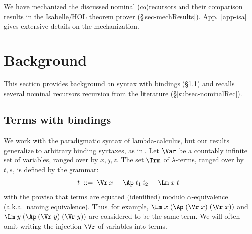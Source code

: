 We have mechanized 
the discussed nominal (co)recursors and their comparison results 
in the Isabelle/HOL theorem prover \cite{LNCS2283} (\S\ref{sec-mechResults}).  
App.~\ref{app-isa} gives extensive details on the mechanization. 


\section{Background} %
\label{sec-nomRec}

This section provides %
background on syntax with bindings (\S\ref{subsec-terms}) and 
recalls %
several 
nominal recursors 
recursion from the literature 
(\S\ref{subsec-nominalRec}).    

\vspace*{-0.5ex}\subsection{Terms with bindings}
\label{subsec-terms}

We work with the paradigmatic syntax of %
lambda-calculus, but our results %
generalize to arbitrary binding syntaxes, as in %
 \cite{pitts-AlphaStructural, nominalTwo}.  %
%
Let $\Var$ be a countably infinite set of variables, ranged over 
by $x,y,z$. %
%
The set $\Trm$ of $\lambda$-terms, ranged over by $t,s$, %
is defined by the grammar: 
%	
  \vspace*{-1.3ex}
	$$
	t \;::=\; \Vr\;x  \;\mid\; \Ap\;t_1\;t_2  \;\mid\; \Lm\;x\;t
		\vspace*{-1ex}
	$$
with the proviso that terms are equated (identified) modulo $\alpha$-equivalence (a.k.a.\ naming equivalence). 
Thus, for example, $\Lm\;x\;(\Ap\;(\Vr\;x)\;(\Vr\;x))$ and 
$\Lm\;y\;(\Ap\;(\Vr\;y)\;(\Vr\;y))$ are considered to be the same term. 
%
We will often omit writing the injection $\Vr$ of variables into terms. 


